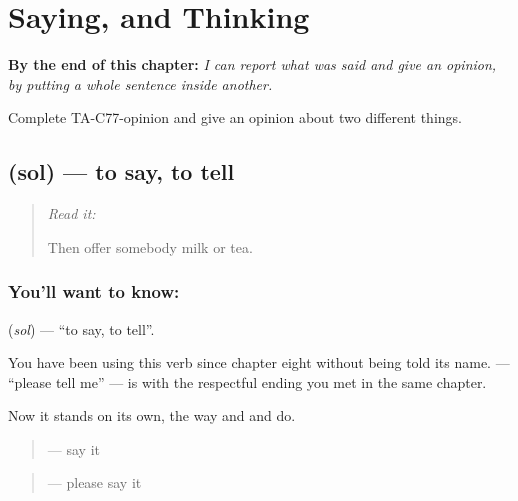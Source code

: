 
\chapter{Saying, and Thinking}
\label{ch:ta-saying-and-thinking}

\begin{chapteropening}
\textbf{By the end of this chapter:} \emph{I can report what was said and give an opinion, by putting a whole sentence inside another.}

Complete TA-C77-opinion and give an opinion about two different things.
\end{chapteropening}

\section[\texorpdfstring{\ta{சொல்} (sol)}{சொல் (sol)}]{ (sol) — to say, to tell}

\label{lesson:TA-C77-say}



\begin{quote}
\emph{Read it:} \textbf{}

Then offer somebody milk or tea.
\end{quote}

\subsection*{You'll want to know: }
\textbf{} (\emph{sol}) — \textquotedblleft{}to say, to tell\textquotedblright{}.

You have been using this verb since chapter eight without being told its name. \textbf{} — \textquotedblleft{}please tell me\textquotedblright{} — is  with the respectful ending you met in the same chapter.

Now it stands on its own, the way  and  and  do.

\begin{quote}
\textbf{} — say it
\end{quote}

\begin{quote}
\textbf{} — please say it
\end{quote}

